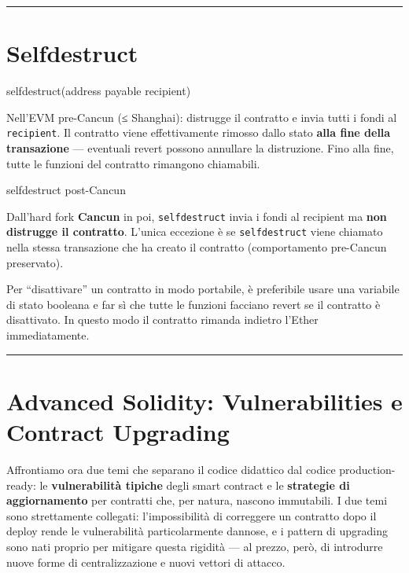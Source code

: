 \documentclass[
  italian,
  openany]{book}
\newenvironment{Shaded}{\begin{snugshade}}{\end{snugshade}}
\newcommand{\NormalTok}[1]{#1}
\begin{document}
\begin{center}\rule{0.5\linewidth}{0.5pt}\end{center}

\section{Selfdestruct}\label{selfdestruct}

\begin{Shaded}
\begin{Highlighting}[]
\NormalTok{selfdestruct(address payable recipient)}
\end{Highlighting}
\end{Shaded}

Nell'EVM pre-Cancun (≤ Shanghai): distrugge il contratto e invia tutti i
fondi al \texttt{recipient}. Il contratto viene effettivamente rimosso
dallo stato \textbf{alla fine della transazione} --- eventuali revert
possono annullare la distruzione. Fino alla fine, tutte le funzioni del
contratto rimangono chiamabili.

\begin{calloutwarning}{selfdestruct post-Cancun}

Dall'hard fork \textbf{Cancun} in poi, \texttt{selfdestruct} invia i
fondi al recipient ma \textbf{non distrugge il contratto}. L'unica
eccezione è se \texttt{selfdestruct} viene chiamato nella stessa
transazione che ha creato il contratto (comportamento pre-Cancun
preservato).

Per ``disattivare'' un contratto in modo portabile, è preferibile usare
una variabile di stato booleana e far sì che tutte le funzioni facciano
revert se il contratto è disattivato. In questo modo il contratto
rimanda indietro l'Ether immediatamente.

\end{calloutwarning}

\begin{center}\rule{0.5\linewidth}{0.5pt}\end{center}

\section{Advanced Solidity: Vulnerabilities e Contract
Upgrading}\label{advanced-solidity-vulnerabilities-e-contract-upgrading}

Affrontiamo ora due temi che separano il codice didattico dal codice
production-ready: le \textbf{vulnerabilità tipiche} degli smart contract
e le \textbf{strategie di aggiornamento} per contratti che, per natura,
nascono immutabili. I due temi sono strettamente collegati:
l'impossibilità di correggere un contratto dopo il deploy rende le
vulnerabilità particolarmente dannose, e i pattern di upgrading sono
nati proprio per mitigare questa rigidità --- al prezzo, però, di
introdurre nuove forme di centralizzazione e nuovi vettori di attacco.
\end{document}
